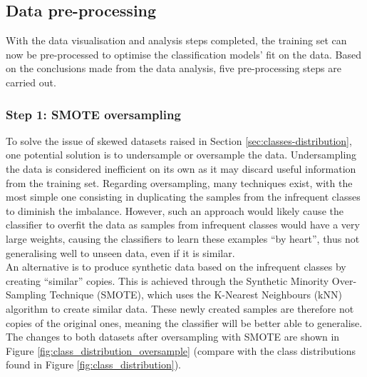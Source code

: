 \documentclass[letterpaper,12pt]{article}
\begin{document}

\newpage
\subsection{Data pre-processing}
\label{sec:data-preprocessing-steps}

With the data visualisation and analysis steps completed, the training set can now be pre-processed to optimise the classification models’ fit on the data. Based on the conclusions made from the data analysis, five pre-processing steps are carried out.

\subsubsection{Step 1: SMOTE oversampling}

To solve the issue of skewed datasets raised in Section \ref{sec:classes-distribution}, one potential solution is to undersample or oversample the data. Undersampling the data is considered inefficient on its own as it may discard useful information from the training set. Regarding oversampling, many techniques exist, with the most simple one consisting in duplicating the samples from the infrequent classes to diminish the imbalance. However, such an approach would likely cause the classifier to overfit the data as samples from infrequent classes would have a very large weights, causing the classifiers to learn these examples ``by heart'', thus not generalising well to unseen data, even if it is similar.\\

An alternative is to produce synthetic data based on the infrequent classes by creating ``similar'' copies. This is achieved through the Synthetic Minority Over-Sampling Technique (SMOTE), which uses the K-Nearest Neighbours (kNN) algorithm to create similar data. These newly created samples are therefore not copies of the original ones, meaning the classifier will be better able to generalise. The changes to both datasets after oversampling with SMOTE are shown in Figure \ref{fig:class_distribution_oversample} (compare with the class distributions found in Figure \ref{fig:class_distribution}).
\end{document}
